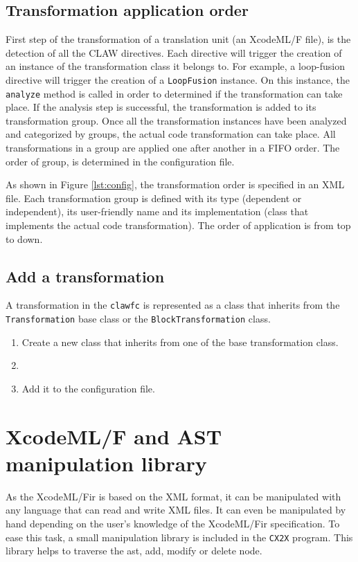 \documentclass[a4paper, 11pt]{report}
\def\xcodeml{XcodeML/F\xspace}
\def\clawfc{\lstinline!clawfc!\xspace}
\def\cx2x{\lstinline!CX2X!\xspace}
\begin{document}
\section{Transformation application order}
First step of the transformation of a translation unit (an XcodeML/F file), is the detection of all the CLAW directives. Each directive will trigger the creation of an instance of the transformation class it belongs to. For example, a loop-fusion directive will trigger the creation of a \lstinline|LoopFusion| instance. On this instance, the \lstinline|analyze| method is called in order to determined if the transformation can take place. If the analysis step is successful, the transformation is added to its transformation group. 
Once all the transformation instances have been analyzed and categorized by groups, the actual code transformation can take place. All transformations in a group are applied one after another in a FIFO order. The order of group, is determined in the configuration file. 



As shown in Figure \ref{lst:config}, the transformation order is specified in an XML file. Each transformation group is defined with its type (dependent or independent), its user-friendly name and its implementation (class that implements the actual code transformation). The order of application is from top to down.


\section{Add a transformation}
A transformation in the \clawfc is represented as a class that inherits from the \lstinline|Transformation| base class or the \lstinline|BlockTransformation| class.

\begin{enumerate}
\item Create a new class that inherits from one of the base transformation class.
\item %
\item Add it to the configuration file.
\end{enumerate}

\chapter{\xcodeml and AST manipulation library}
\label{chapter:astmanip}
As the \xcodeml \gls{ir} is based on the XML format, it can be manipulated with any language that can read and write XML files. It can even be manipulated by hand depending on the user's knowledge of the \xcodeml \gls{ir} specification. 
To ease this task, a small manipulation library is included in the \cx2x program. This library helps to traverse the \gls{ast}, add, modify or delete node.
\end{document}
